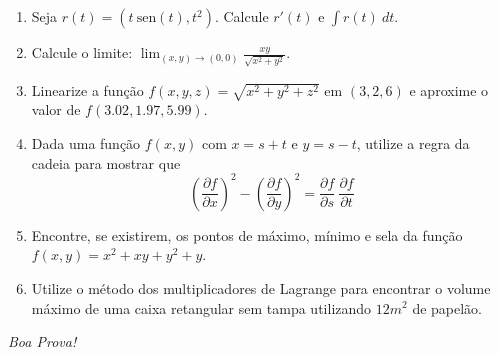 \documentclass[a4paper,5pt]{amsbook}
\newcommand{\sen}{\text{sen}}
\newcommand{\ds}{\displaystyle}
\begin{document}
\vspace{0.2cm}
\begin{enumerate}

\item Seja $r(t) = \left(t\ \sen(t), t^2\right)$. Calcule $r'(t)$ e $\ds\int r(t)\ dt$.
\vspace{0.5cm}

\item Calcule o limite: $\ds\lim_{(x,y)\rightarrow(0,0)} \frac{xy}{\sqrt{x^2+y^2}}$.
\vspace{0.5cm}

\item Linearize a fun\c{c}\~ao $f(x,y,z) = \sqrt{x^2+y^2+z^2}$ em $(3,2,6)$ e aproxime o valor de $f(3.02, 1.97, 5.99)$.
\vspace{0.5cm}

\item Dada uma fun\c{c}\~ao $f(x,y)$ com $x = s + t$ e $y = s-t$, utilize a regra da cadeia para mostrar que
	$$\ds{\left(\frac{\partial f}{\partial x}\right)}^2 - {\left(\frac{\partial f}{\partial y}\right)}^2 = \frac{\partial f}{\partial s}\ \frac{\partial f}{\partial t}$$
\vspace{0.5cm}

\item Encontre, se existirem, os pontos de m\'aximo, m\'inimo e sela da fun\c{c}\~ao $f(x,y) = x^2 + xy + y^2 + y$.
\vspace{0.5cm}

\item Utilize o m\'etodo dos multiplicadores de Lagrange para encontrar o volume
	m\'aximo de uma caixa retangular sem tampa utilizando $12m^2$ de papel\~ao.

\end{enumerate}

\begin{flushright}
	\textit{Boa Prova!}
\end{flushright}
\end{document}
